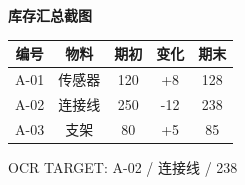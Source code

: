 \documentclass[a4paper]{article}
\begin{document}
{\fontsize{22}{26}\selectfont\bfseries 库存汇总截图}\par\vspace{8mm}
\renewcommand{\arraystretch}{2.1}
\begin{tabular}{|c|c|c|c|c|}\hline
\rowcolor{blue!12} 编号 & 物料 & 期初 & 变化 & 期末\\\hline
A-01 & 传感器 & 120 & +8 & 128\\\hline
A-02 & 连接线 & 250 & -12 & 238\\\hline
A-03 & 支架 & 80 & +5 & 85\\\hline
\end{tabular}
\vspace{14mm}\par\color{gray}\small OCR TARGET: A-02 / 连接线 / 238
\end{document}
